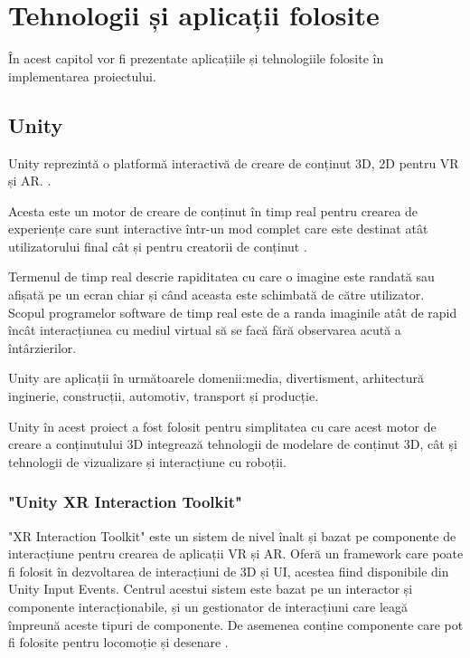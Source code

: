 






\section{Tehnologii și aplicații folosite }
În acest capitol vor fi prezentate aplicațiile și tehnologiile folosite în implementarea proiectului.
\subsection{Unity}
Unity reprezintă o platformă interactivă de creare de conținut 3D,  2D pentru VR și AR. \cite{unity}.

Acesta este un motor de creare de conținut în timp real pentru crearea de experiențe care sunt interactive într-un mod complet care este destinat atât utilizatorului final cât și pentru creatorii de conținut \cite{unity}.

Termenul de timp real descrie rapiditatea cu care o imagine este randată sau afișată pe un ecran chiar și când aceasta este schimbată de către utilizator. Scopul programelor software de timp real este de a randa imaginile atât de rapid încât interacțiunea cu mediul virtual să se facă fără observarea acută a întârzierilor\cite{unity}.

Unity are aplicații în următoarele domenii:media, divertisment, arhitectură
inginerie, construcții, automotiv, transport și producție\cite{unity}.

Unity în acest proiect a fost folosit pentru simplitatea cu care acest motor de creare a conținutului 3D integrează tehnologii de modelare de conținut 3D, cât și tehnologii de vizualizare și interacțiune cu roboții\cite{unity}.

\subsubsection{"Unity XR Interaction Toolkit"}
"XR Interaction Toolkit" este un sistem de nivel înalt și bazat pe componente de interacțiune pentru crearea de aplicații VR și AR. Oferă un framework care poate fi folosit în dezvoltarea de interacțiuni de 3D și UI, acestea fiind disponibile din Unity Input Events. Centrul acestui sistem este bazat pe un interactor și componente interacționabile, și un gestionator de interacțiuni care leagă împreună aceste tipuri de componente. De asemenea conține componente care pot fi folosite pentru locomoție și desenare \cite{XRI}.

